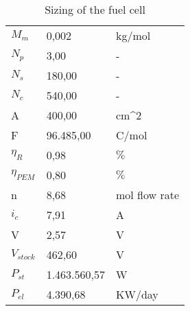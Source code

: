 \begin{table}[ht]
\centering
\begin{tabular}{|lll|}
\hline
\rowcolor{bluepoli!40}\multicolumn{3}{|c|}{\textbf{Fuel cell sizing}}                                  \\ \hline
\multicolumn{1}{|l|}{$M_m$}        & \multicolumn{1}{l|}{0,002}        & kg/mol                \\ \hline
\multicolumn{1}{|l|}{$N_p$}        & \multicolumn{1}{l|}{3,00}         & -                     \\ \hline
\multicolumn{1}{|l|}{$N_s$}        & \multicolumn{1}{l|}{180,00}       & -                     \\ \hline
\multicolumn{1}{|l|}{$N_c$}        & \multicolumn{1}{l|}{540,00}       & -                     \\ \hline
\multicolumn{1}{|l|}{A}            & \multicolumn{1}{l|}{400,00}       & cm\textasciicircum{}2 \\ \hline
\multicolumn{1}{|l|}{F}            & \multicolumn{1}{l|}{96.485,00}    & C/mol                 \\ \hline
\multicolumn{1}{|l|}{$\eta_R$}     & \multicolumn{1}{l|}{0,98}         & $\%$                  \\ \hline
\multicolumn{1}{|l|}{$\eta_{PEM}$} & \multicolumn{1}{l|}{0,80}         & $\%$                  \\ \hline
\multicolumn{1}{|l|}{n}            & \multicolumn{1}{l|}{8,68}         & mol flow rate         \\ \hline
\multicolumn{1}{|l|}{$i_c$}        & \multicolumn{1}{l|}{7,91}         & A                     \\ \hline
\multicolumn{1}{|l|}{V}            & \multicolumn{1}{l|}{2,57}         & V                     \\ \hline
\multicolumn{1}{|l|}{$V_{stock}$}  & \multicolumn{1}{l|}{462,60}       & V                     \\ \hline
\multicolumn{1}{|l|}{$P_{st}$}     & \multicolumn{1}{l|}{1.463.560,57} & W                     \\ \hline
\multicolumn{1}{|l|}{$P_{el}$}     & \multicolumn{1}{l|}{4.390,68}     & KW/day                \\ \hline
\end{tabular}
\caption{Sizing of the fuel cell}
\label{tab:sizefuelcells}
\end{table}